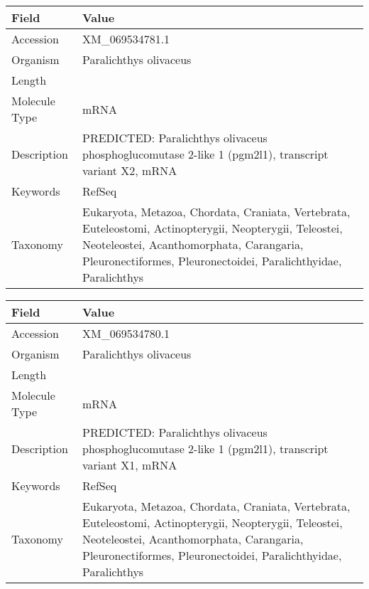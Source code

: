 \documentclass[10pt]{article}
\begin{document}
\vspace{1em}
{\footnotesize
\begin{longtable}{>{\raggedright\arraybackslash}p{4.5cm} >{\raggedright\arraybackslash}p{11.5cm}}
\textbf{Field} & \textbf{Value} \\
\hline
Accession & XM\_069534781.1 \\
Organism & Paralichthys olivaceus \\
Length & 3167 \\
Molecule Type & mRNA \\
Description & PREDICTED: Paralichthys olivaceus phosphoglucomutase 2-like 1 (pgm2l1), transcript variant X2, mRNA \\
Keywords & RefSeq \\
Taxonomy & Eukaryota, Metazoa, Chordata, Craniata, Vertebrata, Euteleostomi, Actinopterygii, Neopterygii, Teleostei, Neoteleostei, Acanthomorphata, Carangaria, Pleuronectiformes, Pleuronectoidei, Paralichthyidae, Paralichthys \\
\end{longtable}
}

\vspace{1em}
{\footnotesize
\begin{longtable}{>{\raggedright\arraybackslash}p{4.5cm} >{\raggedright\arraybackslash}p{11.5cm}}
\textbf{Field} & \textbf{Value} \\
\hline
Accession & XM\_069534780.1 \\
Organism & Paralichthys olivaceus \\
Length & 3191 \\
Molecule Type & mRNA \\
Description & PREDICTED: Paralichthys olivaceus phosphoglucomutase 2-like 1 (pgm2l1), transcript variant X1, mRNA \\
Keywords & RefSeq \\
Taxonomy & Eukaryota, Metazoa, Chordata, Craniata, Vertebrata, Euteleostomi, Actinopterygii, Neopterygii, Teleostei, Neoteleostei, Acanthomorphata, Carangaria, Pleuronectiformes, Pleuronectoidei, Paralichthyidae, Paralichthys \\
\end{longtable}
}
\end{document}
